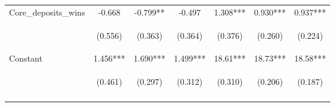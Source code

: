 \documentclass[]{article}
\begin{document}
\begin{center}
\begin{tabular}{lcccccc}
Core\_deposits\_wins & -0.668 & -0.799** & -0.497 & 1.308*** & 0.930*** & 0.937*** \\
\vspace{4pt} & \begin{footnotesize}(0.556)\end{footnotesize} & \begin{footnotesize}(0.363)\end{footnotesize} & \begin{footnotesize}(0.364)\end{footnotesize} & \begin{footnotesize}(0.376)\end{footnotesize} & \begin{footnotesize}(0.260)\end{footnotesize} & \begin{footnotesize}(0.224)\end{footnotesize} \\
Constant & 1.456*** & 1.690*** & 1.499*** & 18.61*** & 18.73*** & 18.58*** \\
 & \begin{footnotesize}(0.461)\end{footnotesize} & \begin{footnotesize}(0.297)\end{footnotesize} & \begin{footnotesize}(0.312)\end{footnotesize} & \begin{footnotesize}(0.310)\end{footnotesize} & \begin{footnotesize}(0.206)\end{footnotesize} & \begin{footnotesize}(0.187)\end{footnotesize} \\
\vspace{4pt} & \begin{footnotesize}\end{footnotesize} & \begin{footnotesize}\end{footnotesize} & \begin{footnotesize}\end{footnotesize} & \begin{footnotesize}\end{footnotesize} & \begin{footnotesize}\end{footnotesize} & \begin{footnotesize}\end{footnotesize} \\

\end{tabular}
\end{center}
\end{document}
